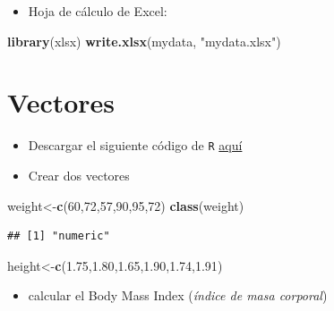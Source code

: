 \documentclass[]{book}
\newenvironment{Shaded}{\begin{snugshade}}{\end{snugshade}}
\newcommand{\KeywordTok}[1]{\textcolor[rgb]{0.13,0.29,0.53}{\textbf{#1}}}
\newcommand{\DecValTok}[1]{\textcolor[rgb]{0.00,0.00,0.81}{#1}}
\newcommand{\FloatTok}[1]{\textcolor[rgb]{0.00,0.00,0.81}{#1}}
\newcommand{\StringTok}[1]{\textcolor[rgb]{0.31,0.60,0.02}{#1}}
\newcommand{\NormalTok}[1]{#1}
\providecommand{\tightlist}{%
  \setlength{\itemsep}{0pt}\setlength{\parskip}{0pt}}
\begin{document}
\begin{itemize}
\tightlist
\item
  Hoja de cálculo de Excel:
\end{itemize}

\begin{Shaded}
\begin{Highlighting}[]
\KeywordTok{library}\NormalTok{(xlsx)}
\KeywordTok{write.xlsx}\NormalTok{(mydata, }\StringTok{"mydata.xlsx"}\NormalTok{)}
\end{Highlighting}
\end{Shaded}

\section{Vectores}\label{vectores}

\begin{itemize}
\item
  Descargar el siguiente código de \texttt{R}
  \href{http://idaejin.github.io/bcam-courses/rbasics/rbasics.R}{aquí}
\item
  Crear dos vectores
\end{itemize}

\begin{Shaded}
\begin{Highlighting}[]
\NormalTok{weight<-}\KeywordTok{c}\NormalTok{(}\DecValTok{60}\NormalTok{,}\DecValTok{72}\NormalTok{,}\DecValTok{57}\NormalTok{,}\DecValTok{90}\NormalTok{,}\DecValTok{95}\NormalTok{,}\DecValTok{72}\NormalTok{)  }
\KeywordTok{class}\NormalTok{(weight)}
\end{Highlighting}
\end{Shaded}

\begin{verbatim}
## [1] "numeric"
\end{verbatim}

\begin{Shaded}
\begin{Highlighting}[]
\NormalTok{height<-}\KeywordTok{c}\NormalTok{(}\FloatTok{1.75}\NormalTok{,}\FloatTok{1.80}\NormalTok{,}\FloatTok{1.65}\NormalTok{,}\FloatTok{1.90}\NormalTok{,}\FloatTok{1.74}\NormalTok{,}\FloatTok{1.91}\NormalTok{)}
\end{Highlighting}
\end{Shaded}

\begin{itemize}
\tightlist
\item
  calcular el Body Mass Index (\emph{índice de masa corporal})
\end{itemize}
\end{document}
